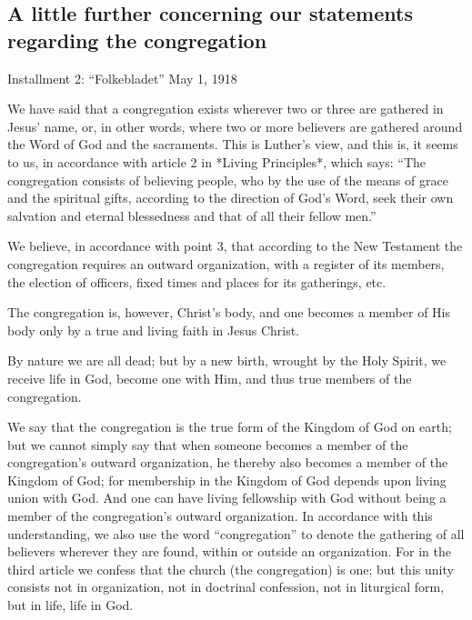 






\subsection{A little further concerning our statements regarding the congregation}

Installment 2: “Folkebladet” May 1, 1918

We have said that a congregation exists wherever two or three are gathered in Jesus’ name, or, in other words, where two or more believers are gathered around the Word of God and the sacraments. This is Luther’s view, and this is, it seems to us, in accordance with article 2 in *Living Principles*, which says: “The congregation consists of believing people, who by the use of the means of grace and the spiritual gifts, according to the direction of God’s Word, seek their own salvation and eternal blessedness and that of all their fellow men.”

We believe, in accordance with point 3, that according to the New Testament the congregation requires an outward organization, with a register of its members, the election of officers, fixed times and places for its gatherings, etc.

The congregation is, however, Christ’s body, and one becomes a member of His body only by a true and living faith in Jesus Christ.

By nature we are all dead; but by a new birth, wrought by the Holy Spirit, we receive life in God, become one with Him, and thus true members of the congregation.

We say that the congregation is the true form of the Kingdom of God on earth; but we cannot simply say that when someone becomes a member of the congregation’s outward organization, he thereby also becomes a member of the Kingdom of God; for membership in the Kingdom of God depends upon living union with God. And one can have living fellowship with God without being a member of the congregation’s outward organization. In accordance with this understanding, we also use the word “congregation” to denote the gathering of all believers wherever they are found, within or outside an organization. For in the third article we confess that the church (the congregation) is one; but this unity consists not in organization, not in doctrinal confession, not in liturgical form, but in life, life in God.

